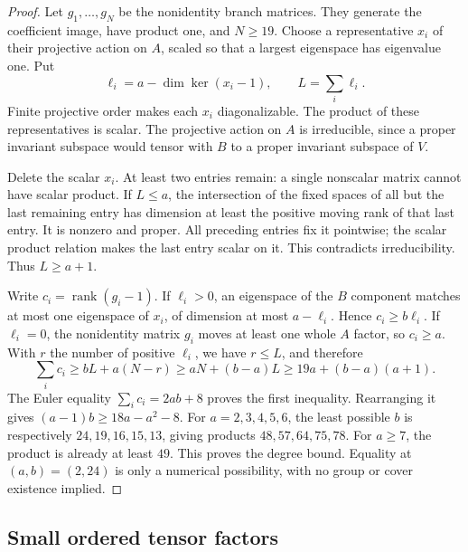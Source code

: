 \documentclass[11pt]{article}
\theoremstyle{definition}
\theoremstyle{remark}
\begin{document}
\begin{proof}
Let $g_1,\ldots,g_N$ be the nonidentity branch matrices.  They generate
the coefficient image, have product one, and $N\ge19$.
Choose a representative $x_i$ of their projective action on $A$,
scaled so that a largest eigenspace has eigenvalue one.  Put
\[
 \ell_i=a-\dim\ker(x_i-1),\qquad L=\sum_i\ell_i.
\]
Finite projective order makes each $x_i$ diagonalizable.  The product
of these representatives is scalar.  The projective action on $A$
is irreducible, since a proper invariant subspace would tensor with
$B$ to a proper invariant subspace of $V$.

Delete the scalar $x_i$.  At least two entries remain: a single
nonscalar matrix cannot have scalar product.  If $L\le a$, the
intersection of the fixed spaces of all but the last remaining
entry has dimension at least the positive moving rank of that last
entry.  It is nonzero and proper.  All preceding entries fix it
pointwise; the scalar product relation makes the last entry scalar
on it.  This contradicts irreducibility.  Thus $L\ge a+1$.

Write $c_i=\operatorname{rank}(g_i-1)$.  If $\ell_i>0$, an eigenspace
of the $B$ component matches at most one eigenspace of $x_i$, of
dimension at most $a-\ell_i$.  Hence $c_i\ge b\ell_i$.
If $\ell_i=0$, the nonidentity matrix $g_i$ moves at least one whole
$A$ factor, so $c_i\ge a$.  With $r$ the number of positive $\ell_i$,
we have $r\le L$, and therefore
\[
 \sum_i c_i\ge bL+a(N-r)
    \ge aN+(b-a)L
    \ge19a+(b-a)(a+1).
\]
The Euler equality $\sum_i c_i=2ab+8$ proves the first inequality.
Rearranging it gives $(a-1)b\ge18a-a^2-8$.
For $a=2,3,4,5,6$, the least possible $b$ is respectively
$24,19,16,15,13$, giving products $48,57,64,75,78$.
For $a\ge7$, the product is already at least $49$.
This proves the degree bound.  Equality at $(a,b)=(2,24)$ is only
a numerical possibility, with no group or cover existence implied.
\end{proof}

\subsection{Small ordered tensor factors}
\end{document}
